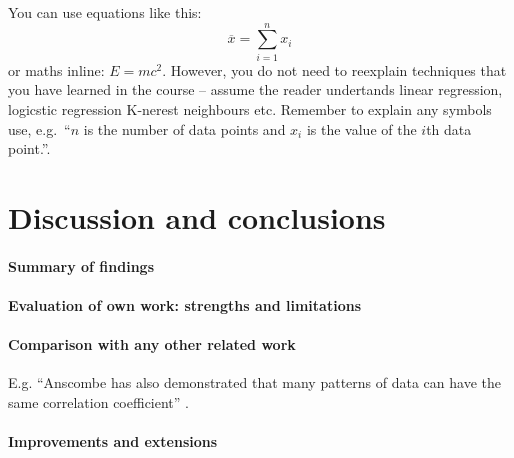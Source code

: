 \documentclass[11pt,a4paper]{article}
\begin{document}
You can use equations like this:
\begin{equation}
  \label{fds-project-template:eq:1}
  \overline{x} = \sum_{i=1}^n x_i
\end{equation}
or maths inline: $E=mc^2$. However, you do not need to reexplain techniques that you have learned in the course -- assume the reader undertands linear regression, logicstic regression K-nerest neighbours etc.  Remember to explain any symbols use, e.g.~``$n$ is the number of data points and $x_i$ is the value of the $i$th data point.''.

\section{Discussion and conclusions}

\paragraph{Summary of findings}

\paragraph{Evaluation of own work: strengths and limitations}

\paragraph{Comparison with any other related work}
E.g. ``Anscombe has also demonstrated that many patterns of data can
have the same correlation coefficient'' \cite{Ansc73Grap}.

\paragraph{Improvements and extensions}



\end{document}
